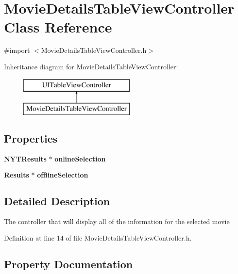 \section{Movie\+Details\+Table\+View\+Controller Class Reference}
\label{interface_movie_details_table_view_controller}


{\ttfamily \#import $<$Movie\+Details\+Table\+View\+Controller.\+h$>$}

Inheritance diagram for Movie\+Details\+Table\+View\+Controller\+:\begin{figure}[H]
\begin{center}
\leavevmode
\includegraphics[height=2.000000cm]{interface_movie_details_table_view_controller}
\end{center}
\end{figure}
\subsection*{Properties}
\begin{DoxyCompactItemize}
\item 
{\bf N\+Y\+T\+Results} $\ast$ {\bf online\+Selection}
\item 
{\bf Results} $\ast$ {\bf offline\+Selection}
\end{DoxyCompactItemize}


\subsection{Detailed Description}
The controller that will display all of the information for the selected movie 

Definition at line 14 of file Movie\+Details\+Table\+View\+Controller.\+h.



\subsection{Property Documentation}
